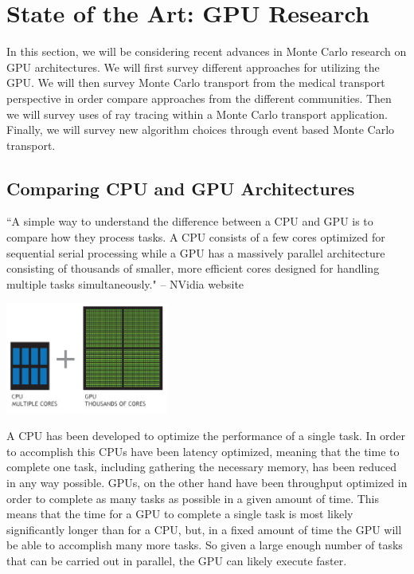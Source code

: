 \section{ \textbf{State of the Art: GPU Research} }
\label{sec:SOTAGPU}

In this section, we will be considering recent advances in Monte Carlo research on GPU architectures.
%
We will first survey different approaches for utilizing the GPU. 
%
We will then survey Monte Carlo transport from the medical transport perspective in order compare approaches from the different communities.
%
Then we will survey uses of ray tracing within a Monte Carlo transport application.
%
Finally, we will survey new algorithm choices through event based Monte Carlo transport.
%

%
\subsection{\textbf{ Comparing CPU and GPU Architectures} }

``A simple way to understand the difference between a CPU and GPU is to compare how they process tasks. A CPU consists of a few cores optimized for sequential serial processing while a GPU has a massively parallel architecture consisting of thousands of smaller, more efficient cores designed for handling multiple tasks simultaneously." -- NVidia website~\cite{CPUvGPUnvidia}

\includegraphics[width=0.4\textwidth]{cpu-and-gpu.jpg}~\cite{CPUvGPUnvidia}

A CPU has been developed to optimize the performance of a single task. 
%
In order to accomplish this CPUs have been latency optimized, meaning that the time to complete one task, including gathering the necessary memory, has been reduced in any way possible.
%
GPUs, on the other hand have been throughput optimized in order to complete as many tasks as possible in a given amount of time.
%
This means that the time for a GPU to complete a single task is most likely significantly longer than for a CPU, but, in a fixed amount of time the GPU will be able to accomplish many more tasks.
%
So given a large enough number of tasks that can be carried out in parallel, the GPU can likely execute faster.


